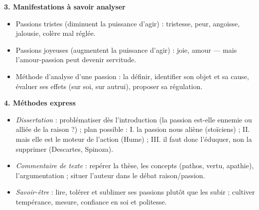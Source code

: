 \documentclass[11pt]{article}
\begin{document}
\begin{bilan}
\textbf{3. Manifestations à savoir analyser}
\begin{itemize}
  \item Passions tristes (diminuent la puissance d'agir) : tristesse, peur, angoisse, jalousie, colère mal réglée.
  \item Passions joyeuses (augmentent la puissance d'agir) : joie, amour — mais l'amour-passion peut devenir servitude.
  \item Méthode d'analyse d'une passion : la définir, identifier son objet et sa cause, évaluer ses effets (sur soi, sur autrui), proposer sa régulation.
\end{itemize}

\textbf{4. Méthodes express}
\begin{itemize}
  \item \emph{Dissertation} : problématiser dès l'introduction (la passion est-elle ennemie ou alliée de la raison ?) ; plan possible : I. la passion nous aliène (stoïciens) ; II. mais elle est le moteur de l'action (Hume) ; III. il faut donc l'éduquer, non la supprimer (Descartes, Spinoza).
  \item \emph{Commentaire de texte} : repérer la thèse, les concepts (pathos, vertu, apathie), l'argumentation ; situer l'auteur dans le débat raison/passion.
  \item \emph{Savoir-être} : lire, tolérer et sublimer ses passions plutôt que les subir ; cultiver tempérance, mesure, confiance en soi et politesse.
\end{itemize}
\end{bilan}
\end{document}
